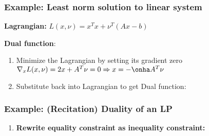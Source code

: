 \documentclass[8pt,a4paper]{scrartcl}
\begin{document}
\begin{multicols*}{3}
\begin{itemize}
\end{itemize}



\subsubsection{Example: Least norm solution to linear system}


\textbf{Lagrangian:} $L(x,\nu)=x^Tx+\nu^T(Ax-b)$

\finn

\textbf{Dual function}:

\begin{enumerate}
\ncompaq
\item Minimize the Lagrangian by setting its gradient zero
$\nabla_xL(x,\nu)=2x+A^T\nu=0\Rightarrow x=-\onha A^T\nu$
\item Substitute back into Lagrangian to get Dual function:

\end{enumerate}

\subsubsection{Example: (Recitation) Duality of an LP}


\begin{enumerate}
\ncompaq
\item \textbf{Rewrite equality constraint as inequality constraint:}




\end{enumerate}
\end{multicols*}
\end{document}
